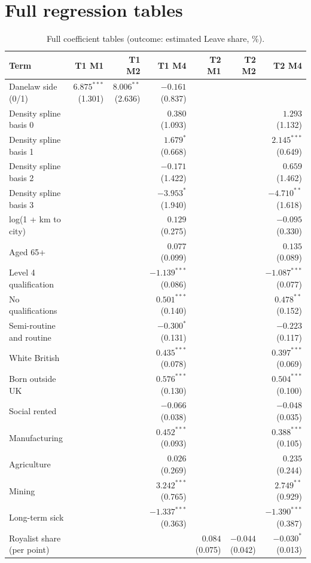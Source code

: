 \documentclass[11pt,a4paper]{article}
\begin{document}
\section{Full regression tables}\label{app:tables}
\begin{table}[tbp]\centering\tiny\caption{Full coefficient tables (outcome: estimated Leave share, \%).}\label{tab:full}\begin{tabular}{lrrrrrr}\toprule Term & T1 M1 & T1 M2 & T1 M4 & T2 M1 & T2 M2 & T2 M4\\\midrule
Danelaw side (0/1) & $6.875^{***}$ (1.301) & $8.006^{**}$ (2.636) & $-0.161$ (0.837) &  &  & \\
Density spline basis 0 &  &  & $0.380$ (1.093) &  &  & $1.293$ (1.132)\\
Density spline basis 1 &  &  & $1.679^{*}$ (0.668) &  &  & $2.145^{***}$ (0.649)\\
Density spline basis 2 &  &  & $-0.171$ (1.422) &  &  & $0.659$ (1.462)\\
Density spline basis 3 &  &  & $-3.953^{*}$ (1.940) &  &  & $-4.710^{**}$ (1.618)\\
log(1 + km to city) &  &  & $0.129$ (0.275) &  &  & $-0.095$ (0.330)\\
Aged 65+ &  &  & $0.077$ (0.099) &  &  & $0.135$ (0.089)\\
Level 4 qualification &  &  & $-1.139^{***}$ (0.086) &  &  & $-1.087^{***}$ (0.077)\\
No qualifications &  &  & $0.501^{***}$ (0.140) &  &  & $0.478^{**}$ (0.152)\\
Semi-routine and routine &  &  & $-0.300^{*}$ (0.131) &  &  & $-0.223$ (0.117)\\
White British &  &  & $0.435^{***}$ (0.078) &  &  & $0.397^{***}$ (0.069)\\
Born outside UK &  &  & $0.576^{***}$ (0.130) &  &  & $0.504^{***}$ (0.100)\\
Social rented &  &  & $-0.066$ (0.038) &  &  & $-0.048$ (0.035)\\
Manufacturing &  &  & $0.452^{***}$ (0.093) &  &  & $0.388^{***}$ (0.105)\\
Agriculture &  &  & $0.026$ (0.269) &  &  & $0.235$ (0.244)\\
Mining &  &  & $3.242^{***}$ (0.765) &  &  & $2.749^{**}$ (0.929)\\
Long-term sick &  &  & $-1.337^{***}$ (0.363) &  &  & $-1.390^{***}$ (0.387)\\
Royalist share (per point) &  &  &  & $0.084$ (0.075) & $-0.044$ (0.042) & $-0.030^{*}$ (0.013)\\

\end{tabular}
\end{table}
\end{document}
